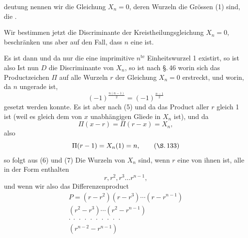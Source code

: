 
deutung nennen wir die Gleichung $X_n = 0$, deren Wurzeln die Grössen (1) sind, die .

Wir bestimmen jetzt die Discriminante der Kreistheilungsgleichung $X_n = 0$, beschränken uns aber auf den Fall, dass $n$ eine  ist.

Es ist dann
und da nur die eine imprimitive $n^{\text{te}}$ Einheitswurzel 1 existirt, so ist
also
Ist nun $D$ die Discriminante von $X_n$, so ist nach \S.\,46
worin sich das Productzeichen $\Pi$ auf alle Wurzeln $r$ der Gleichung $X_n = 0$ erstreckt, und worin, da $n$ ungerade ist,
\[
(-1)^{\frac{n(n-1)}{2}} = (-1)^{\frac{n-1}{2}}
\]
gesetzt werden konnte. Es ist aber nach (5)
und da das Product aller $r$ gleich 1 ist (weil es gleich dem von $x$ unabhängigen Gliede in $X_n$ ist), und da
\[
\Pi(x-r) = \Pi(r-x) = X_n,
\]
also
\[
\Pi(r-1) = X_n(1) = n, \qquad (\text{\S.\,133})
\]
so folgt aus (6) und (7)
Die Wurzeln von $X_n$ sind, wenn $r$ eine von ihnen ist, alle in der Form enthalten
\[
r, r^2, r^3 \ldots r^{n-1},
\]
und wenn wir also das Differenzenproduct
\begin{equation}
\tag*{9)}
\begin{gathered}
P = (r - r^2)(r - r^3) \cdots (r - r^{n-1}) \\
(r^2 - r^3) \cdots (r^2 - r^{n-1}) \\
\cdot\ \cdot\ \cdot\ \cdot\ \cdot\ \cdot\ \cdot\ \cdot\ \cdot\ \cdot \\
(r^{n-2} - r^{n-1})
\end{gathered}
\end{equation} %
